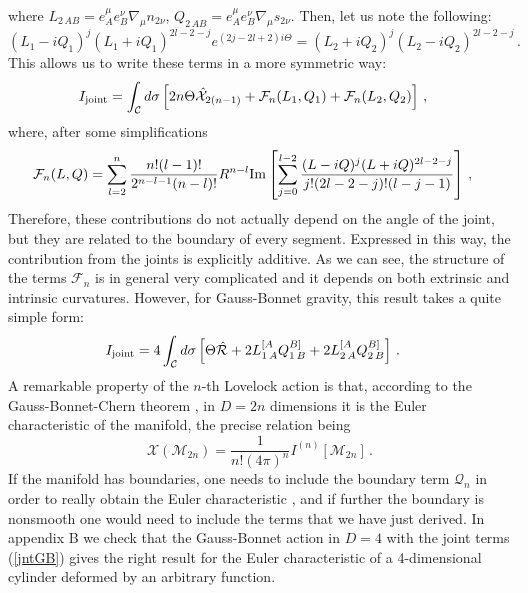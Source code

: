 \documentclass[11pt,letterpaper]{article}
\begin{document}
where $L_{2\, AB}=e_{A}^{\mu}e_{B}^{\nu}\nabla_{\mu}n_{2\nu}$, $Q_{2\, AB}=e_{A}^{\mu}e_{B}^{\nu}\nabla_{\mu}s_{2\nu}$. Then, let us note the following:
\begin{equation}
(L_1-iQ_1)^j(L_1+iQ_1)^{2l-2-j}e^{(2j-2l+2)i\Theta}=(L_2+iQ_2)^j(L_2-iQ_2)^{2l-2-j}\, .
\end{equation}
This allows us to write these terms in a more symmetric way:
\begin{equation}
\begin{aligned}
I_{\rm joint}&=\int_{\mathcal{C}}d\sigma \left[2n \Theta  \hat{\mathcal{X}}_{2(n-1)}+\mathcal{F}_n(L_1,Q_1)+\mathcal{F}_n(L_2,Q_2)\right]\, ,
\end{aligned}
\end{equation}
where, after some simplifications
\begin{equation}
\begin{aligned}
\mathcal{F}_n(L,Q)&=\sum_{l=2}^{n}\frac{n!(l-1)!}{2^{n-l-1}(n-l)!}R^{n-l}{\rm Im}\left[\sum_{j=0}^{l-2}\frac{(L-i Q)^j(L+i Q)^{2l-2-j}}{j!(2l-2-j)!(l-j-1)}\right]\, ,
\end{aligned}
\end{equation}
Therefore, these contributions do not actually depend on the angle of the joint, but they are related to the boundary of every segment. Expressed in this way, the contribution from the joints is explicitly additive. As we can see, the structure of the terms $\mathcal{F}_n$ is in general very complicated and it depends on both extrinsic and intrinsic curvatures. However, for Gauss-Bonnet gravity, this result takes a quite simple form:
\begin{equation}\label{jntGB}
\begin{aligned}
I_{\rm joint}&=4\int_{\mathcal{C}}d\sigma \left[\Theta\hat{\mathcal{R}}+2L^{[A}_{1\, A}Q^{B]}_{1\, B}+2L^{[A}_{2\, A}Q^{B]}_{2\, B}\right]\, .
\end{aligned}
\end{equation}
A remarkable property of the $n$-th Lovelock action is that, according to the Gauss-Bonnet-Chern theorem \cite{GBCTheorem}, in $D=2n$ dimensions it is the Euler characteristic of the manifold, the precise relation being
\begin{equation}
\mathcal{X}(\mathcal{M}_{2n})=\frac{1}{n! (4\pi)^n}I^{(n)}\left[\mathcal{M}_{2n}\right]\, .
\end{equation}
 If the manifold has boundaries, one needs to include the boundary term $\mathcal{Q}_n$ in order to really obtain the Euler characteristic \cite{10.2307/1990134}, and if further the boundary is nonsmooth one would need to include the terms that we have just derived. In appendix B we check that the Gauss-Bonnet action in $D=4$ with the joint terms (\ref{jntGB}) gives the right result for the Euler characteristic of a 4-dimensional cylinder deformed by an arbitrary function.
\end{document}
